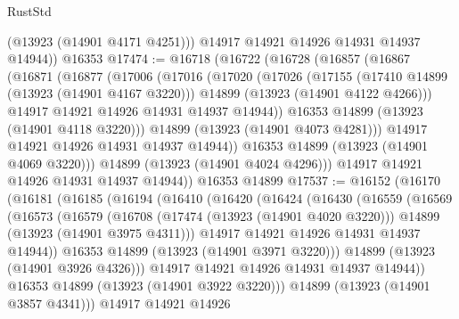 \begin{lexlean}{RustStd}
\begin{coremodule}
          (@13923 (@14901 @4171 @4251)))
        @14917
        @14921
        @14926
        @14931
        @14937
        @14944))
    @16353
@17474 := @16718
    (@16722
      (@16728
        (@16857
          (@16867
            (@16871
              (@16877
                (@17006
                  (@17016
                    (@17020
                      (@17026
                        (@17155
                          (@17410 @14899 (@13923 (@14901 @4167 @3220)))
                          @14899
                          (@13923 (@14901 @4122 @4266)))
                        @14917
                        @14921
                        @14926
                        @14931
                        @14937
                        @14944))
                    @16353
                    @14899
                    (@13923 (@14901 @4118 @3220)))
                  @14899
                  (@13923 (@14901 @4073 @4281)))
                @14917
                @14921
                @14926
                @14931
                @14937
                @14944))
            @16353
            @14899
            (@13923 (@14901 @4069 @3220)))
          @14899
          (@13923 (@14901 @4024 @4296)))
        @14917
        @14921
        @14926
        @14931
        @14937
        @14944))
    @16353
    @14899
@17537 := @16152
    (@16170
      (@16181
        (@16185
          (@16194
            (@16410
              (@16420
                (@16424
                  (@16430
                    (@16559
                      (@16569
                        (@16573
                          (@16579
                            (@16708
                              (@17474 (@13923 (@14901 @4020 @3220)))
                              @14899
                              (@13923 (@14901 @3975 @4311)))
                            @14917
                            @14921
                            @14926
                            @14931
                            @14937
                            @14944))
                        @16353
                        @14899
                        (@13923 (@14901 @3971 @3220)))
                      @14899
                      (@13923 (@14901 @3926 @4326)))
                    @14917
                    @14921
                    @14926
                    @14931
                    @14937
                    @14944))
                @16353
                @14899
                (@13923 (@14901 @3922 @3220)))
              @14899
              (@13923 (@14901 @3857 @4341)))
            @14917
            @14921
            @14926

\end{coremodule}
\end{lexlean}
